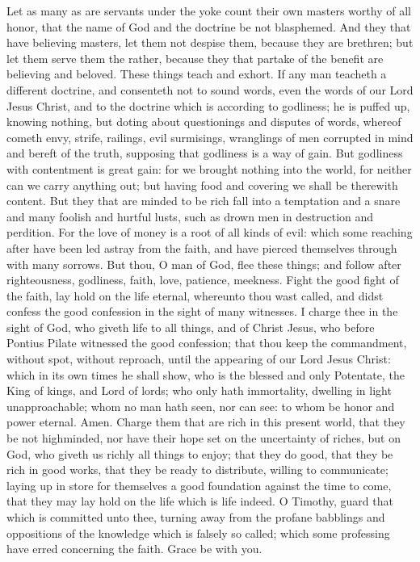 Let as many as are servants under the yoke count their own masters worthy of all honor, that the name of God and the doctrine be not blasphemed. And they that have believing masters, let them not despise them, because they are brethren; but let them serve them the rather, because they that partake of the benefit are believing and beloved. These things teach and exhort.  If any man teacheth a different doctrine, and consenteth not to sound words, even the words of our Lord Jesus Christ, and to the doctrine which is according to godliness; he is puffed up, knowing nothing, but doting about questionings and disputes of words, whereof cometh envy, strife, railings, evil surmisings, wranglings of men corrupted in mind and bereft of the truth, supposing that godliness is a way of gain. But godliness with contentment is great gain: for we brought nothing into the world, for neither can we carry anything out; but having food and covering we shall be therewith content. But they that are minded to be rich fall into a temptation and a snare and many foolish and hurtful lusts, such as drown men in destruction and perdition. For the love of money is a root of all kinds of evil: which some reaching after have been led astray from the faith, and have pierced themselves through with many sorrows.  But thou, O man of God, flee these things; and follow after righteousness, godliness, faith, love, patience, meekness. Fight the good fight of the faith, lay hold on the life eternal, whereunto thou wast called, and didst confess the good confession in the sight of many witnesses. I charge thee in the sight of God, who giveth life to all things, and of Christ Jesus, who before Pontius Pilate witnessed the good confession; that thou keep the commandment, without spot, without reproach, until the appearing of our Lord Jesus Christ: which in its own times he shall show, who is the blessed and only Potentate, the King of kings, and Lord of lords; who only hath immortality, dwelling in light unapproachable; whom no man hath seen, nor can see: to whom be honor and power eternal. Amen.  Charge them that are rich in this present world, that they be not highminded, nor have their hope set on the uncertainty of riches, but on God, who giveth us richly all things to enjoy; that they do good, that they be rich in good works, that they be ready to distribute, willing to communicate; laying up in store for themselves a good foundation against the time to come, that they may lay hold on the life which is life indeed.  O Timothy, guard that which is committed unto thee, turning away from the profane babblings and oppositions of the knowledge which is falsely so called; which some professing have erred concerning the faith. Grace be with you. 